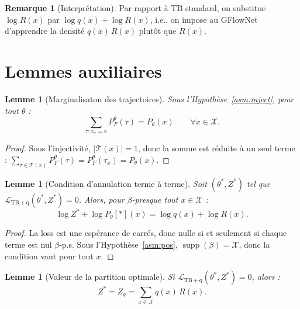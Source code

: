\documentclass[11pt,a4paper]{article}
\theoremstyle{plain}
\newtheorem{lemma}[theorem]{Lemme}
\theoremstyle{definition}
\newtheorem{remark}[theorem]{Remarque}
\theoremstyle{remark}
\newcommand{\calX}{\mathcal{X}}
\newcommand{\calT}{\mathcal{T}}
\newcommand{\calL}{\mathcal{L}}
\newcommand{\pF}{P_F}
\newcommand{\pth}{P_\theta}
\newcommand{\supp}{\operatorname{supp}}
\begin{document}
\begin{remark}[Interprétation]
Par rapport à TB standard, on substitue $\log R(x)$ par $\log q(x) + \log R(x)$,
i.e., on impose au GFlowNet d'apprendre la densité $q(x)\,R(x)$ plutôt que $R(x)$.
\end{remark}

\section{Lemmes auxiliaires}
\label{sec:lemmas}

\begin{lemma}[Marginalisaton des trajectoires]
\label{lem:marg}
Sous l'Hypothèse~\ref{asm:inject}, pour tout $\theta$ :
\begin{equation}
  \sum_{\tau : x_\tau = x} \pF^\theta(\tau) = \pth(x) \qquad \forall x \in \calX.
\end{equation}
\end{lemma}

\begin{proof}
Sous l'injectivité, $|\calT(x)| = 1$, donc la somme est réduite à un seul terme :
$\sum_{\tau \in \calT(x)} \pF^\theta(\tau) = \pF^\theta(\tau_x) = \pth(x)$.
\end{proof}

\begin{lemma}[Condition d'annulation terme à terme]
\label{lem:zero}
Soit $(\theta^*, Z^*)$ tel que $\calL_{\mathrm{TB+q}}(\theta^*, Z^*) = 0$.
Alors, pour $\beta$-presque tout $x \in \calX$ :
\begin{equation}
  \log Z^* + \log \pth[*](x) = \log q(x) + \log R(x).
\end{equation}
\end{lemma}

\begin{proof}
La loss est une espérance de carrés, donc nulle si et seulement si chaque terme
est nul $\beta$-p.s. Sous l'Hypothèse~\ref{asm:pos}, $\supp(\beta) = \calX$,
donc la condition vaut pour tout $x$.
\end{proof}

\begin{lemma}[Valeur de la partition optimale]
\label{lem:Zstar}
Si $\calL_{\mathrm{TB+q}}(\theta^*, Z^*) = 0$, alors :
\begin{equation}
  Z^* = Z_q = \sum_{x \in \calX} q(x)\,R(x).
\end{equation}
\end{lemma}
\end{document}
